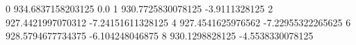 0 934.6837158203125 0.0
1 930.7725830078125 -3.9111328125
2 927.4421997070312 -7.24151611328125
4 927.4541625976562 -7.22955322265625
6 928.5794677734375 -6.104248046875
8 930.1298828125 -4.5538330078125
